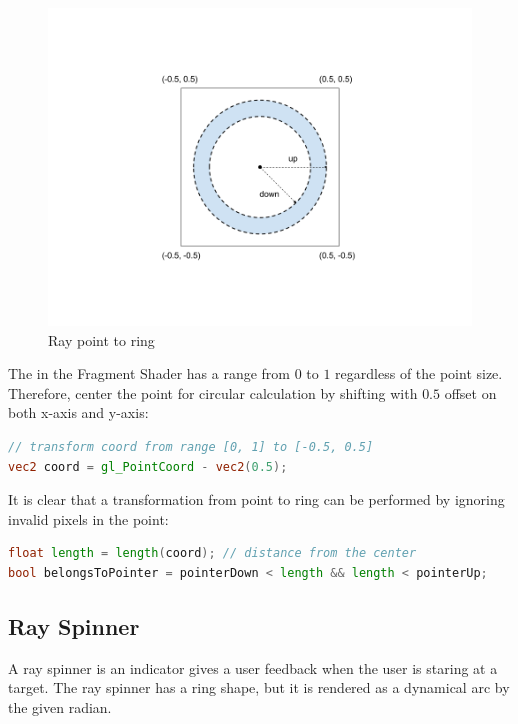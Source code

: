 \begin{figure}[H]
\caption{Ray point to ring}
\label{fig:ray-point2ring}
\centering
\includegraphics[width=\textwidth, keepaspectratio]{Figures/ray-point2ring.png}
\decoRule
\end{figure}

The  in the Fragment Shader has a range from $0$ to $1$ regardless of the point size. Therefore, center the point for circular calculation by shifting with $0.5$ offset on both x-axis and y-axis:

\begin{lstlisting}[language=Glsl]
// transform coord from range [0, 1] to [-0.5, 0.5]
vec2 coord = gl_PointCoord - vec2(0.5);
\end{lstlisting}

It is clear that a transformation from point to ring can be performed by ignoring invalid pixels in the point:

\begin{lstlisting}[language=Glsl]
float length = length(coord); // distance from the center
bool belongsToPointer = pointerDown < length && length < pointerUp;
\end{lstlisting}

\subsection{Ray Spinner}
\label{section:ray-spinner}

A ray spinner is an indicator gives a user feedback when the user is staring at a target. The ray spinner has a ring shape, but it is rendered as a dynamical arc by the given radian.

